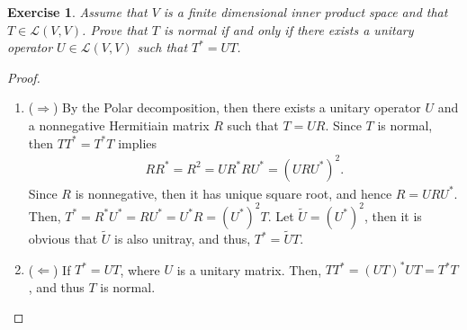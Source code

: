 \documentclass[11pt]{article}
\newtheorem{exercise}{Exercise}[section]
\theoremstyle{definition}
\numberwithin{equation}{subsection}
\begin{document}
\medskip

\begin{exercise}\label{April_2017_5}
Assume that $V$ is a finite dimensional inner product space and that $T \in \mathscr{L}(V, V)$. Prove that $T$ is normal if and only if there exists a unitary operator $U \in \mathscr{L}(V, V)$ such that $T^* = UT$.
\end{exercise}
\begin{proof}
~\begin{enumerate}[label=(\alph*)]
    \item ($\Rightarrow$) By the Polar decomposition, then there exists a unitary operator $U$ and a nonnegative Hermitiain matrix $R$ such that $T = UR$. Since $T$ is normal, then $TT^* = T^*T$ implies
    \begin{align*}
        R R^* = R^2 = U R^* R U^*= (U R U^*)^2.
    \end{align*}
    Since $R$ is nonnegative, then it has unique square root, and hence $R = U R U^*$. Then, $T^* = R^* U^* = R U^* = U^* R = (U^*)^2 T$. Let $\widetilde{U} = (U^*)^2$, then it is obvious that $\widetilde{U}$ is also unitray, and thus, $T^* = \widetilde{U} T$.
    
    \item ($\Leftarrow$) If $T^* = UT$, where $U$ is a unitary matrix. Then, $TT^* = (UT)^* UT = T^* T$, and thus $T$ is normal.
\end{enumerate}
\end{proof}

\medskip
\end{document}
